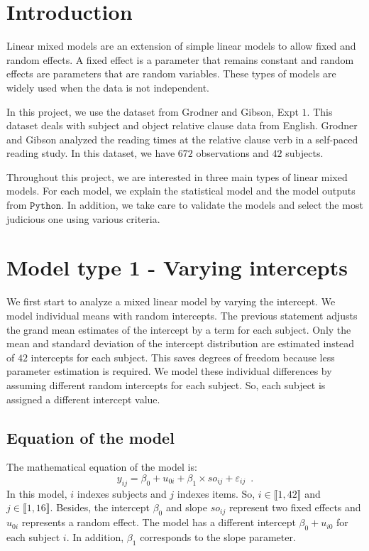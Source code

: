 \documentclass{article}
\begin{document}
\section*{Introduction}

Linear mixed models are an extension of simple linear models to allow fixed and random effects. A fixed effect is a parameter that remains constant and random effects are parameters that are random variables. These types of models are widely used when the data is not independent.

In this project, we use the dataset from Grodner and Gibson, Expt $1$.
This dataset deals with subject and object relative clause data from English.
Grodner and Gibson analyzed the reading times at the relative clause verb in a self-paced reading study. In this dataset, we have $672$ observations and $42$ subjects.

Throughout this project, we are interested in three main types of linear mixed models. For each model, we explain the statistical model and the model outputs from $\texttt{Python}$. In addition, we take care to validate the models and select the most judicious one using various criteria.


\section{Model type 1 - Varying intercepts}
We first start to analyze a mixed linear model by varying the intercept.
We model individual means with random intercepts.
The previous statement adjusts the grand mean estimates of the intercept by a term for each subject. Only the mean and standard deviation of the intercept distribution are estimated instead of $42$ intercepts for each subject.
This saves degrees of freedom because less parameter estimation is required.
We  model these individual differences by assuming different random intercepts for each subject. So, each subject is assigned a different intercept value.

\subsection{Equation of the model}
The mathematical equation of the model is:
\begin{equation}
y_{ij}= \beta_0 + u_{0i} + \beta_1 \times so_{ij} + \varepsilon_{ij}\enspace. \label{rel:mod1}
\end{equation}
In this model, $i$ indexes subjects and $j$ indexes items. So, $i \in \llbracket1,42\rrbracket$ and $j \in \llbracket1,16\rrbracket.$
Besides, the intercept $\beta_0$ and slope $so_{ij}$  represent two fixed effects and $u_{0i}$ represents a random effect. The model has a different intercept $\beta_0 + u_{i0}$ for each subject $i$. In addition, $\beta_1$ corresponds to the slope parameter.
\end{document}

